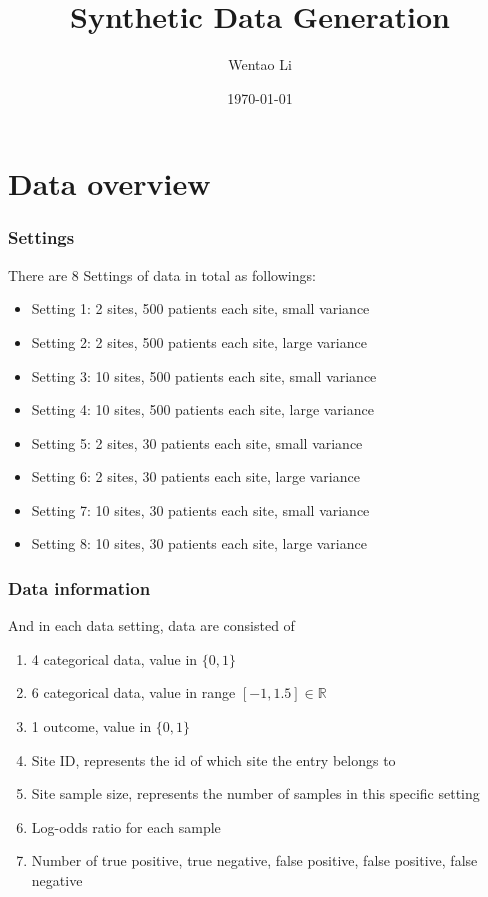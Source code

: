 \documentclass[12pt]{article}
\title{Synthetic Data Generation}
\author{Wentao Li}
\date{\today}
\theoremstyle{definition}
\theoremstyle{remark}
\begin{document}
\maketitle
\section*{Data overview}
\subsubsection*{Settings}
There are 8 Settings of data in total as followings:
\begin{itemize}
	\item Setting 1: 2 sites, 500 patients each site, small variance
	\item Setting 2: 2 sites, 500 patients each site, large variance
	\item Setting 3: 10 sites, 500 patients each site, small variance
	\item Setting 4: 10 sites, 500 patients each site, large variance
	\item Setting 5: 2 sites, 30 patients each site, small variance
    \item Setting 6: 2 sites, 30 patients each site, large variance
	\item Setting 7: 10 sites, 30 patients each site, small variance
	\item Setting 8: 10 sites, 30 patients each site, large variance
\end{itemize}
\subsubsection*{Data information}
And in each data setting, data are consisted of
\begin{enumerate}
	\item 4 categorical data, value in $\{0,1\}$
	\item 6 categorical data, value in range $[-1,1.5]\in\mathbb R$
	\item 1 outcome, value in $\{0,1\}$
	\item Site ID, represents the id of which site the entry belongs to
	\item Site sample size, represents the number of samples in this specific setting
	\item Log-odds ratio for each sample
	\item Number of true positive, true negative, false positive, false positive, false negative
\end{enumerate}
\end{document}
